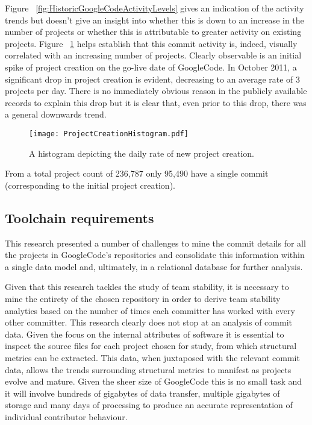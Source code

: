 Figure ~\ref{fig:HistoricGoogleCodeActivityLevels} gives an indication of the activity trends but doesn't give an insight into whether this is down to an increase in the number of projects or whether this is attributable to greater activity on existing projects. Figure ~\ref{fig:ProjectCreationHistogram} helps establish that this commit activity is, indeed, visually correlated with an increasing number of projects. Clearly observable is an initial spike of project creation on the go-live date of GoogleCode. In October 2011, a significant drop in project creation is evident, decreasing to an average rate of 3 projects per day. There is no immediately obvious reason in the publicly available records to explain this drop but it is clear that, even prior to this drop, there was a general downwards trend.

\begin{figure}[htbp!] 
\centering    
\texttt{[image: ProjectCreationHistogram.pdf]}
\caption{A histogram depicting the daily rate of new project creation.}
\label{fig:ProjectCreationHistogram}
\end{figure}
	
From a total project count of 236,787 only 95,490 have a single commit (corresponding to the initial project creation). 			

\subsection{Toolchain requirements}
This research presented a number of challenges to mine the commit details for all the projects in GoogleCode's repositories and consolidate this information within a single data model and, ultimately, in a relational database for further analysis. 

Given that this research tackles the study of team stability, it is necessary to mine the entirety of the chosen repository in order to derive team stability analytics based on the number of times each committer has worked with every other committer. This research clearly does not stop at an analysis of commit data. Given the focus on the internal attributes of software it is essential to inspect the source files for each project chosen for study, from which structural metrics can be extracted. This data, when juxtaposed with the relevant commit data, allows the trends surrounding structural metrics to manifest as projects evolve and mature. Given the sheer size of GoogleCode this is no small task and it will involve hundreds of gigabytes of data transfer, multiple gigabytes of storage and many days of processing to produce an accurate representation of individual contributor behaviour.


